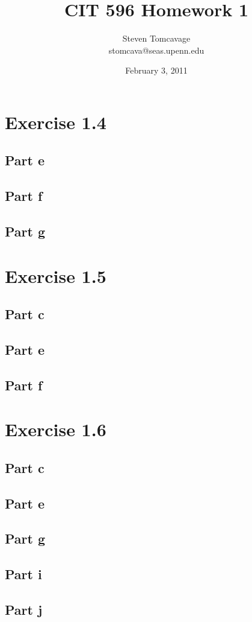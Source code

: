 \documentclass{article}
\title{CIT 596 Homework 1}
\author{Steven Tomcavage\\stomcava@seas.upenn.edu}
\date{February 3, 2011}
\begin{document}
\maketitle

\section{Exercise 1.4}

\subsection{Part e}

\subsection{Part f}

\subsection{Part g}

\section{Exercise 1.5}

\subsection{Part c}

\subsection{Part e}

\subsection{Part f}

\section{Exercise 1.6}

\subsection{Part c}

\subsection{Part e}

\subsection{Part g}

\subsection{Part i}

\subsection{Part j}

\section{}

\section{}
\end{document}
